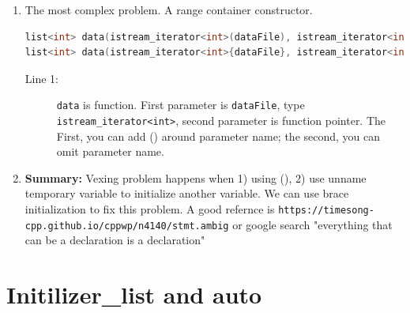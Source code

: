 \documentclass[a4paper,11pt,twoside]{book}
\begin{document}
\begin{enumerate}
	
	\item The most complex problem. A range container constructor. 
\begin{lstlisting}[frame=single, language=c++, mathescape=true]
list<int> data(istream_iterator<int>(dataFile), istream_iterator<int>()); //error
list<int> data(istream_iterator<int>{dataFile}, istream_iterator<int>{}));//OK
\end{lstlisting}
\begin{description}
	\item[Line 1:] \texttt{data} is function. First parameter is \texttt{dataFile}, type \texttt{istream\_iterator<int>}, second parameter is function pointer. The First, you can add () around parameter name;  the second, you can omit parameter name.
\end{description}
		
	\item \textbf{Summary:} Vexing problem happens when 1) using (), 2) use unname temporary variable to initialize another variable. We can use brace initialization to fix this problem. A good refernce is \verb|https://timesong-cpp.github.io/cppwp/n4140/stmt.ambig| or google search 
	"everything that can be a declaration is a declaration" 
	
\end{enumerate}



\section{Initilizer\_list and auto}
\end{document}
